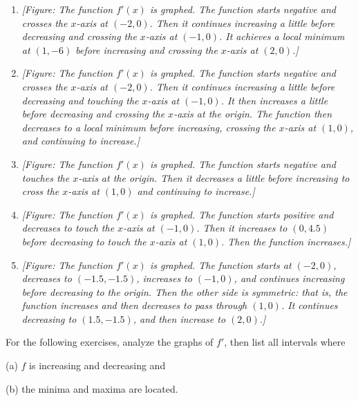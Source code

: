 \documentclass{exercises}
\begin{document}
\begin{enumerate}[resume]
\item \textit{[Figure: The function $f'(x)$ is graphed. The function starts negative and crosses the $x$-axis at $(-2,0)$. Then it continues increasing a little before decreasing and crossing the $x$-axis at $(-1,0)$. It achieves a local minimum at $(1,-6)$ before increasing and crossing the $x$-axis at $(2,0)$.]}
\item \textit{[Figure: The function $f'(x)$ is graphed. The function starts negative and crosses the $x$-axis at $(-2,0)$. Then it continues increasing a little before decreasing and touching the $x$-axis at $(-1,0)$. It then increases a little before decreasing and crossing the $x$-axis at the origin. The function then decreases to a local minimum before increasing, crossing the $x$-axis at $(1,0)$, and continuing to increase.]}
\item \textit{[Figure: The function $f'(x)$ is graphed. The function starts negative and touches the $x$-axis at the origin. Then it decreases a little before increasing to cross the $x$-axis at $(1,0)$ and continuing to increase.]}
\item \textit{[Figure: The function $f'(x)$ is graphed. The function starts positive and decreases to touch the $x$-axis at $(-1,0)$. Then it increases to $(0,4.5)$ before decreasing to touch the $x$-axis at $(1,0)$. Then the function increases.]}
\item \textit{[Figure: The function $f'(x)$ is graphed. The function starts at $(-2,0)$, decreases to $(-1.5,-1.5)$, increases to $(-1,0)$, and continues increasing before decreasing to the origin. Then the other side is symmetric: that is, the function increases and then decreases to pass through $(1,0)$. It continues decreasing to $(1.5,-1.5)$, and then increase to $(2,0)$.]}
\end{enumerate}

For the following exercises, analyze the graphs of $f'$, then list all intervals where


(a) $f$ is increasing and decreasing and


(b) the minima and maxima are located.
\end{document}
